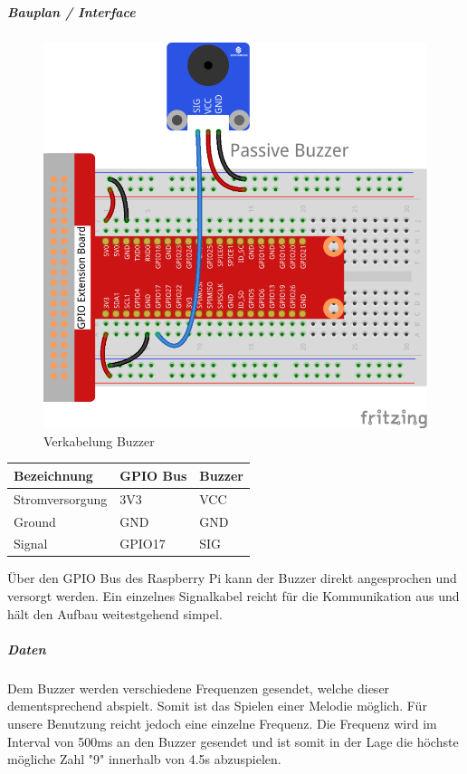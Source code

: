 \documentclass[../../main.tex]{subfiles}
\begin{document}
\subparagraph{Bauplan / Interface}

\begin{figure}[H] \centering
  \includegraphics{VerkabelungAkustik}
  \caption{Verkabelung Buzzer}
  \label{fig:Buzzer}
\end{figure}

\begin{table}[H]
\begin{flushleft}
\begin{tabular}{lll}
\hline
Bezeichnung     & GPIO Bus & Buzzer \\ \hline
Stromversorgung & 3V3      & VCC    \\ \hline
Ground          & GND      & GND    \\ \hline
Signal          & GPIO17   & SIG    \\ \hline
\end{tabular}
\end{flushleft}
\end{table}

Über den GPIO Bus des Raspberry Pi kann der Buzzer direkt angesprochen und versorgt werden. Ein einzelnes Signalkabel reicht für die Kommunikation aus und hält den Aufbau weitestgehend simpel.

\subparagraph{Daten}
Dem Buzzer werden verschiedene Frequenzen gesendet, welche dieser dementsprechend abspielt. Somit ist das Spielen einer Melodie möglich. Für unsere Benutzung reicht jedoch eine einzelne Frequenz. Die Frequenz wird im Interval von 500ms an den Buzzer gesendet und ist somit in der Lage die höchste mögliche Zahl "9" innerhalb von 4.5s abzuspielen.
\end{document}
